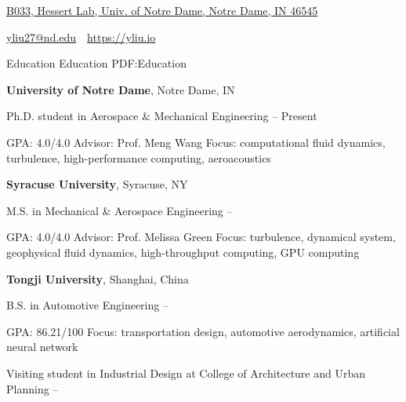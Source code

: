 \documentclass[letterpaper,MMMyyyy,nonstopmode]{simpleresumecv}
\newcommand{\CVAuthor}{Yi Liu (Steven)}
\newcommand{\CVWebpage}{https://yliu.io}
\begin{document}

\Title{\CVAuthor}

\begin{SubTitle}
\href{https://www.google.com/maps/place/B033%2C%20Hessert%20Lab%2C%20Univ.%20of%20Notre%20Dame%2C%20Notre%20Dame%2C%20IN%2046545}
{B033, Hessert Lab, Univ. of Notre Dame, Notre Dame, IN 46545}
\par
\href{mailto:yliu27@nd.edu}
{yliu27@nd.edu}
\,\SubBulletSymbol\,
\href{\CVWebpage}
{\url{\CVWebpage}}
\end{SubTitle}

\begin{Body}


\Section
{Education}
{Education}
{PDF:Education}

    \Entry
    \textbf{University of Notre Dame},
    Notre Dame, IN

    \Gap
        \BulletItem
        Ph.D. student in Aerospace \& Mechanical Engineering
        \hfill
         -- Present
            \begin{Detail}
                        \SubBulletItem
                        GPA: 4.0/4.0
                        \SubBulletItem
                        Advisor: Prof. Meng Wang
                    \SubBulletItem
                    Focus:
                    computational fluid dynamics, turbulence, high-performance computing, aeroacoustics
            \end{Detail}
    \Entry
    \textbf{Syracuse University},
    Syracuse, NY

    \Gap
        \BulletItem
        M.S. in Mechanical \& Aerospace Engineering
        \hfill
         -- 
            \begin{Detail}
                        \SubBulletItem
                        GPA: 4.0/4.0
                        \SubBulletItem
                        Advisor: Prof. Melissa Green
                    \SubBulletItem
                    Focus:
                    turbulence, dynamical system, geophysical fluid dynamics, high-throughput computing, GPU computing
            \end{Detail}
    \Entry
    \textbf{Tongji University},
    Shanghai, China

    \Gap
        \BulletItem
        B.S. in Automotive Engineering
        \hfill
         -- 
            \begin{Detail}
                        \SubBulletItem
                        GPA: 86.21/100
                    \SubBulletItem
                    Focus:
                    transportation design, automotive aerodynamics, artificial neural network
            \end{Detail}
        \BulletItem
        Visiting student in Industrial Design at College of Architecture and Urban Planning
        \hfill
         -- 


\end{Body}
\end{document}
